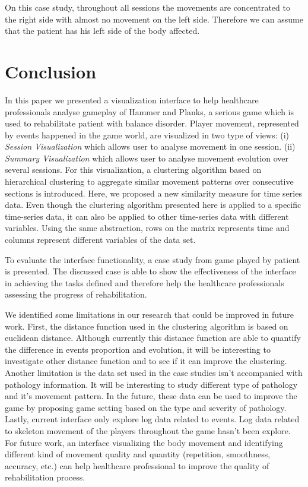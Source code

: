 \documentclass{vgtc}                          %
\begin{document}
On this case study, throughout all sessions the movements are concentrated to the right side with almost no movement on the left side. Therefore we can assume that the patient has his left side of the body affected. 

\section{Conclusion}

In this paper we presented a visualization interface to help healthcare professionals analyse gameplay of Hammer and Planks, a serious game which is used to rehabilitate patient with balance disorder. Player movement, represented by events happened in the game world, are visualized in two type of views: (i) \textit{Session Visualization} which allows user to analyse movement in one session. (ii) \textit{Summary Visualization} which allows user to analyse movement evolution over several sessions. For this visualization, a clustering algorithm based on hierarchical clustering to aggregate similar movement patterns over consecutive sections is introduced. Here, we proposed a new similarity measure for time series data. Even though the clustering algorithm presented here is applied to a specific time-series data, it can also be applied to other time-series data with different variables. Using the same abstraction, rows on the matrix represents time and columns represent different variables of the data set.

To evaluate the interface functionality, a case study from game played by patient is presented. The discussed case is able to show the effectiveness of the interface in achieving the tasks defined and therefore help the healthcare professionals assessing the progress of rehabilitation.

We identified some limitations in our research that could be improved in future work. First, the distance function used in the clustering algorithm is based on euclidean distance. Although currently this distance function are able to quantify the difference in events proportion and evolution, it will be interesting to investigate other distance function and to see if it can improve the clustering. Another limitation is the data set used in the case studies isn't accompanied with pathology information. It will be interesting to study different type of pathology and it's movement pattern. In the future, these data can be used to improve the game by proposing game setting based on the type and severity of pathology. Lastly, current interface only explore log data related to events. Log data related to skeleton movement of the players throughout the game hasn't been explore. For future work, an interface visualizing the body movement and identifying different kind of movement quality and quantity (repetition, smoothness, accuracy, etc.) can help healthcare professional to improve the quality of rehabilitation process. 




\end{document}
